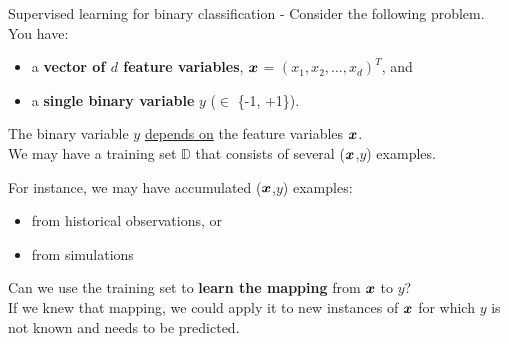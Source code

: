 \begin{frame}[t,allowframebreaks]{Supervised learning for binary classification -}
    Consider the following problem. You have:
    \begin{itemize}
        \item a {\bf vector of $d$ feature variables}, $\boldsymbol{x}$ = $(x_1, x_2, ..., x_d)^T$, and
        \item a {\bf single binary variable} $y$ ($\in$ \{-1, +1\}).   
    \end{itemize}
    The binary variable $y$ \underline{depends on} the feature variables $\boldsymbol{x}$.\\
    \vspace{0.4cm}
    We may have a \gls{training set} $\mathbb{D}$ that 
    consists of several ($\boldsymbol{x}$,$y$) examples.\\
    \begin{blockexample}{}
        \small
        For instance, we may have accumulated ($\boldsymbol{x}$,$y$) examples:
        \begin{itemize}
            \small
            \item from historical observations, or
            \item from simulations
        \end{itemize}
    \end{blockexample}  
    \vspace{0.2cm}
    Can we use the \gls{training set} to {\bf learn the mapping} from $\boldsymbol{x}$ to $y$?\\
    \vspace{0.2cm}
    If we knew that mapping, we could apply it to new instances of $\boldsymbol{x}$
    for which $y$ is not known and needs to be predicted.
\end{frame}
